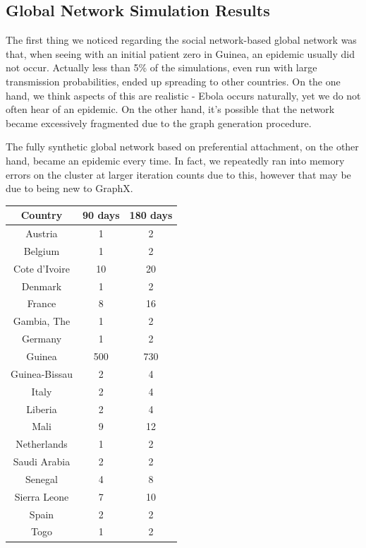 \documentclass[10pt, journal,onecolumn]{IEEEtran}
\begin{document}
\subsection{{Global Network Simulation Results}}

The first thing we noticed regarding the social network-based global network was that, when seeing
with an initial patient zero in Guinea, an epidemic usually did not occur. Actually less than 5\%
of the simulations, even run with large transmission probabilities, ended up spreading to other
countries. On the one hand, we think aspects of this are realistic - Ebola occurs naturally, yet we
do not often hear of an epidemic. On the other hand, it's possible that the network became excessively
fragmented due to the graph generation procedure.

The fully synthetic global network based on preferential attachment, on the other hand, became an
epidemic every time. In fact, we repeatedly ran into memory errors on the cluster at larger iteration
counts due to this, however that may be due to being new to GraphX.

    \begin{tabular}{ |c|c|c| }
      \hline
      \textbf{Country} & \textbf{90 days} & \textbf{180 days} \\
      \hline
      Austria	& 1 & 2 \\
      Belgium	& 1 & 2 \\
      Cote d'Ivoire	& 10 & 20 \\
      Denmark	& 1 & 2 \\
      France	& 8 & 16 \\
      Gambia, The	& 1 & 2 \\
      Germany	& 1 & 2 \\
      Guinea	& 500 & 730 \\
      Guinea-Bissau	& 2 & 4 \\
      Italy	& 2 & 4 \\
      Liberia	& 2 & 4 \\
      Mali	& 9 & 12 \\
      Netherlands	& 1 & 2 \\
      Saudi Arabia	& 2 & 2 \\
      Senegal	& 4 & 8 \\
      Sierra Leone	& 7 & 10 \\
      Spain	& 2 & 2 \\
      Togo	& 1 & 2 \\
      \hline
    \end{tabular}
\end{document}
